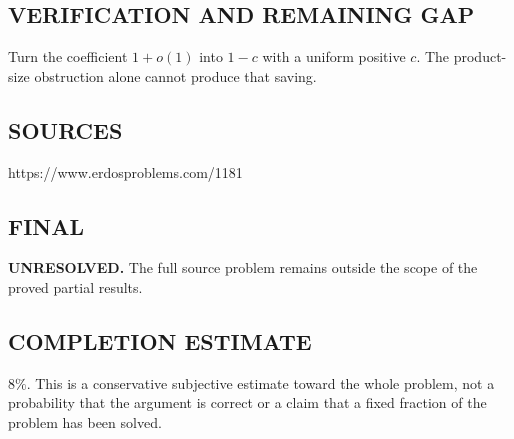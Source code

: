 \subsection*{VERIFICATION AND REMAINING GAP}
Turn the coefficient $1+o(1)$ into $1-c$ with a uniform positive $c$.
The product-size obstruction alone cannot produce that saving.

\subsection*{SOURCES}
https://www.erdosproblems.com/1181

\subsection*{FINAL}
\textbf{UNRESOLVED.} The full source problem remains outside the scope of the proved partial results.

\subsection*{COMPLETION ESTIMATE}
$8\%$. This is a conservative subjective estimate toward the whole problem, not a probability that the argument is correct or a claim that a fixed fraction of the problem has been solved.
